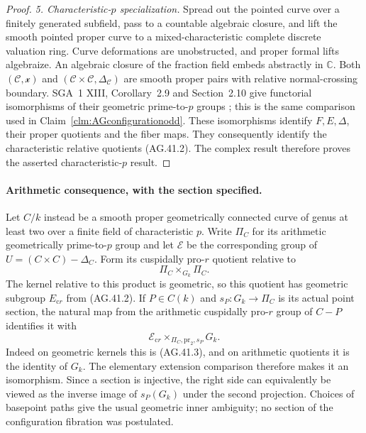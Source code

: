 \begin{proof}
\emph{5. Characteristic-\(p\) specialization.}
Spread out the pointed curve over a finitely generated
subfield, pass to a countable algebraic closure, and lift
the smooth pointed proper curve to a mixed-characteristic
complete discrete valuation ring. Curve deformations are
unobstructed, and proper formal lifts algebraize. An
algebraic closure of the fraction field embeds abstractly
in \(\mathbb C\). Both
\((\mathcal C,\mathcal x)\) and
\((\mathcal C\times\mathcal C,\Delta_{\mathcal C})\)
are smooth proper pairs with relative normal-crossing
boundary. SGA~1 XIII, Corollary~2.9 and Section~2.10 give
functorial isomorphisms of their geometric prime-to-\(p\)
groups \cite{AR_SGA1}; this is the same comparison used
in Claim~\ref{clm:AGconfigurationodd}.
These isomorphisms identify \(F,E,\Delta\), their proper
quotients and the fiber maps. They consequently identify
the characteristic relative quotients (AG.41.2).
The complex result therefore proves the asserted
characteristic-\(p\) result.
\end{proof}

\paragraph{Arithmetic consequence, with the section specified.}
Let \(C/k\) instead be a smooth proper geometrically
connected curve of genus at least two over a finite field
of characteristic \(p\). Write \(\Pi_C\) for its
arithmetic geometrically prime-to-\(p\) group and let
\(\mathcal E\) be the corresponding group of
\(U=(C\times C)-\Delta_C\). Form its cuspidally
pro-\(r\) quotient relative to
\[
                \Pi_C\times_{G_k}\Pi_C.
                                                        \tag{AG.41.13}
\]
The kernel relative to this product is geometric, so this
quotient has geometric subgroup \(E_{\mathrm{c}r}\)
from (AG.41.2). If \(P\in C(k)\) and
\(s_P:G_k\to\Pi_C\) is its actual point section,
the natural map from the arithmetic cuspidally pro-\(r\)
group of \(C-P\) identifies it with
\[
       \mathcal E_{\mathrm{c}r}
                  \times_{\Pi_C,\mathrm{pr}_2,s_P}G_k.
                                                        \tag{AG.41.14}
\]
Indeed on geometric kernels this is (AG.41.3), and on
arithmetic quotients it is the identity of \(G_k\).
The elementary extension comparison therefore makes it
an isomorphism. Since a section is injective, the right
side can equivalently be viewed as the inverse image of
\(s_P(G_k)\) under the second projection. Choices of
basepoint paths give the usual geometric inner ambiguity;
no section of the configuration fibration was postulated.

